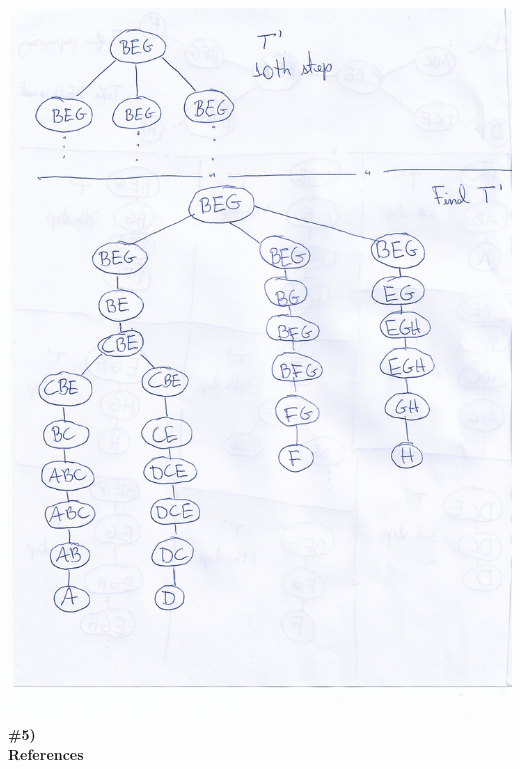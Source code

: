 \documentclass{article}
\begin{document}
\includegraphics[scale=0.7]{2nd_demo_graph_hw3}
\textbf{\#5)}
\\
\textbf{References}
\\
\end{document}

